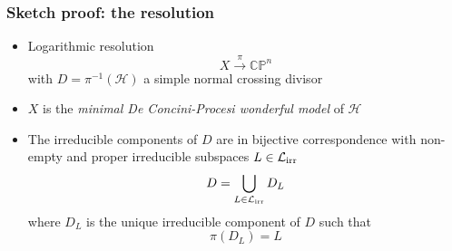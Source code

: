 \documentclass{beamer}
\newcommand{\CP}{\mathbb{CP}}
\newcommand{\mH}{\mathcal{H}}
\newcommand{\mLi}{\mathcal{L}_{\textup{irr}}}
\begin{document}
\begin{frame}
	\frametitle{Sketch proof: the resolution}
	\begin{itemize}
		\pause
		\item Logarithmic resolution
		\[
		X \xrightarrow{\pi} \CP^n
		\]
		with \(D = \pi^{-1}(\mH)\) a simple normal crossing divisor
		
		\pause
		\item \(X\) is the \emph{minimal De Concini-Procesi wonderful model} of \(\mH\)
		
		\pause
		\item The irreducible components of \(D\) are in bijective correspondence with non-empty and proper irreducible subspaces \(L \in \mLi\) 
		\[
		D = \bigcup_{L \in \mLi} D_L
		\]
		where \(D_L\) is the unique irreducible component of \(D\) such that 
		\[
		\pi(D_L) = L 
		\]
	\end{itemize}
\end{frame}
\end{document}
